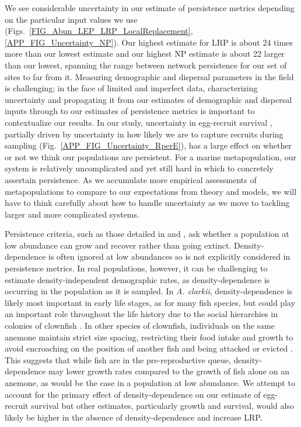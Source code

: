 \documentclass[12pt, oneside]{article}   	%
\begin{document}
We see considerable uncertainty in our estimate of persistence metrics depending on the particular input values we use (Figs.\ \ref{FIG_Abun_LEP_LRP_LocalReplacement}, \ref{APP_FIG_Uncertainty_NP}). Our highest estimate for LRP is about 24 times more than our lowest estimate and our highest NP estimate is about 22 larger than our lowest, spanning the range between network persistence for our set of sites to far from it. Measuring demographic and dispersal parameters in the field is challenging; in the face of limited and imperfect data, characterizing uncertainty and propagating it from our estimates of demographic and dispersal inputs through to our estimates of persistence metrics is important to contextualize our results. In our study, uncertainty in egg-recruit survival \citep[a commonly challenging parameter to estimate, e.g.][]{johnson2018integrating,hameed2016inverse}, partially driven by uncertainty in how likely we are to capture recruits during sampling (Fig.\ \ref{APP_FIG_Uncertainty_RperE}), has a large effect on whether or not we think our populations are persistent. For a marine metapopulation, our system is relatively uncomplicated and yet still hard in which to concretely assertain persistence. As we accumulate more empirical assessments of metapopulations to compare to our expectations from theory and models, we will have to think carefully about how to handle uncertainty as we move to tackling larger and more complicated systems. %

Persistence criteria, such as those detailed in \cite{hastings_persistence_2006} and \cite{burgess2014beyond}, ask whether a population at low abundance can grow and recover rather than going extinct. Density-dependence is often ignored at low abundances \citep{botsford2019population} so is not explicitly considered in persistence metrics. In real populations, however, it can be challenging to estimate density-independent demographic rates, as density-dependence is occurring in the population as it is sampled. In \textit{A. clarkii}, density-dependence is likely most important in early life stages, as for many fish species, but could play an important role throughout the life history due to the social hierarchies in colonies of clownfish \citep[e.g.][]{buston2011determinants}. In other species of clownfish, individuals on the same anemone maintain strict size spacing, restricting their food intake and growth to avoid encroaching on the position of another fish and being attacked or evicted \citep[seen in \textit{A. percula},][]{buston2003forcible, buston2003social}. This suggests that while fish are in the pre-reproductive queue, density-dependence may lower growth rates compared to the growth of fish alone on an anemone, as would be the case in a population at low abundance. We attempt to account for the primary effect of density-dependence on our estimate of egg-recruit survival but other estimates, particularly growth and survival, would also likely be higher in the absence of density-dependence and increase LRP.
\end{document}
